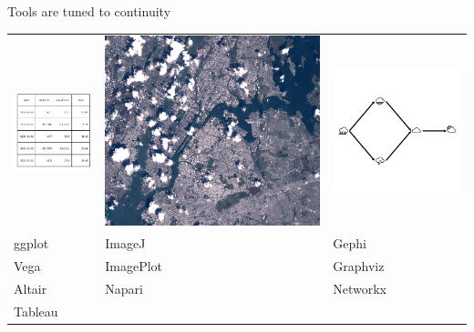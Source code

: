 \documentclass[xcolor={dvipsnames}, handout]{beamer}
\begin{document}
\begin{frame}{Tools are tuned to continuity \cite{HeerSoftware2006}}
\begin{table}
    \begin{tabulary}{\textwidth}{|L|l|l|}\toprule
        \includegraphics[width=.24\textwidth]{figures/intro/table.png} & \includegraphics[width=.3\textwidth]{figures/intro/landsat.png} & \includegraphics[width=.33\textwidth]{figures/math/graph.png} \\
        ggplot\cite{wickhamGgplot2ElegantGraphics2016a}  & ImageJ\cite{schneiderNIHImageImageJ2012}& Gephi\cite{bastianGephiOpenSource2009}\\
        Vega\cite{satyanarayanDeclarativeInteractionDesign2014} & ImagePlot\cite{studiesCulturevisImageplot2021} & Graphviz\cite{ellsonGraphvizOpenSource2002}\\
        Altair\cite{vanderplasAltairInteractiveStatistical2018}& Napari\cite{nicholas_sofroniew_2021_4533308} & Networkx\cite{HagbergExploringNetwork2008}\\
         Tableau\cite{StoltePolaris2002,hanrahanVizQL2006,MackinlayShowme2007} & &\\
         \bottomrule
    \end{tabulary}
\end{table}
\end{frame}
\end{document}
